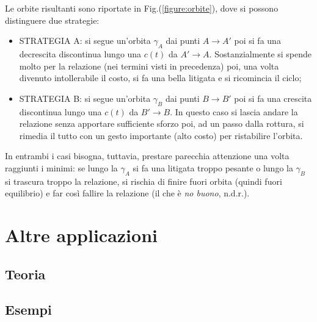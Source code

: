 \documentclass[12pt, a4paper]{book}
\theoremstyle{theorem}
\newtheorem{theorem}{Teorema}[section]
\begin{document}
				Le orbite risultanti sono riportate in Fig.(\ref{figure:orbite}), dove si possono distinguere due strategie:
				\begin{itemize}
					\item STRATEGIA A: si segue un'orbita $\gamma_{A}$ dai punti $A\rightarrow A'$ poi si fa una decrescita discontinua lungo una $c(t)$ da $A'\rightarrow A$.
						Sostanzialmente si spende molto per la relazione (nei termini visti in precedenza) poi, una volta divenuto intollerabile il costo, si fa una bella litigata e si ricomincia il ciclo;
					\item STRATEGIA B: si segue un'orbita $\gamma_{B}$ dai punti $B\rightarrow B'$ poi si fa una crescita discontinua lungo una $c(t)$ da $B'\rightarrow B$.
						In questo caso si lascia andare la relazione senza apportare sufficiente sforzo poi, ad un passo dalla rottura, si rimedia il tutto con un gesto importante (alto costo) per ristabilire l'orbita.
				\end{itemize}
				In entrambi i casi bisogna, tuttavia, prestare parecchia attenzione una volta raggiunti i minimi: se lungo la $\gamma_{A}$ si fa una litigata troppo pesante o lungo la $\gamma_{B}$ si trascura troppo la relazione, si rischia di finire fuori orbita (quindi fuori equilibrio) e far così fallire la relazione (il che è \emph{no buono}, n.d.r.).


	\chapter{Altre applicazioni} %
		\section{Teoria}

		\section{Esempi}


		
\end{document}
